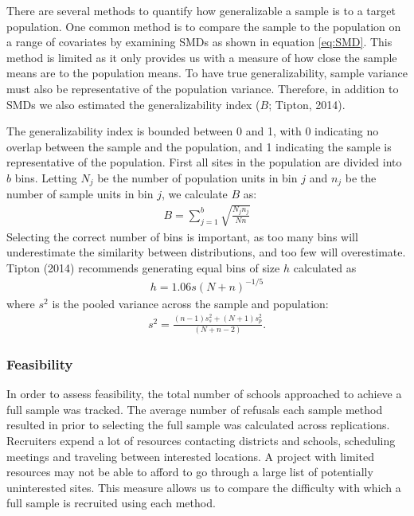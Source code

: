 \documentclass[man,floatsintext]{apa6}
\begin{document}
There are several methods to quantify how generalizable a sample is to a target population. One common method is to compare the sample to the population on a range of covariates by examining SMDs as shown in equation \eqref{eq:SMD}. This method is limited as it only provides us with a measure of how close the sample means are to the population means. To have true generalizability, sample variance must also be representative of the population variance. Therefore, in addition to SMDs we also estimated the generalizability index (\(B\); Tipton, 2014).

The generalizability index is bounded between 0 and 1, with 0 indicating no overlap between the sample and the population, and 1 indicating the sample is representative of the population. First all sites in the population are divided into \(b\) bins. Letting \(N_j\) be the number of population units in bin \(j\) and \(n_j\) be the number of sample units in bin \(j\), we calculate \(B\) as:
\begin{align}
B = \sum^b_{j=1}\sqrt{\frac{N_j n_j}{N n}}
\end{align}
Selecting the correct number of bins is important, as too many bins will underestimate the similarity between distributions, and too few will overestimate. Tipton (2014) recommends generating equal bins of size \(h\) calculated as
\begin{align}
h = 1.06s(N+n)^{-1/5}
\end{align}
where \(s^2\) is the pooled variance across the sample and population:
\begin{align}
s^2 = \frac{(n - 1)s^2_s + (N + 1)s^2_p}{(N + n - 2)}.
\end{align}

\hypertarget{feasibility}{%
\subsubsection{Feasibility}\label{feasibility}}

In order to assess feasibility, the total number of schools approached to achieve a full sample was tracked. The average number of refusals each sample method resulted in prior to selecting the full sample was calculated across replications. Recruiters expend a lot of resources contacting districts and schools, scheduling meetings and traveling between interested locations. A project with limited resources may not be able to afford to go through a large list of potentially uninterested sites. This measure allows us to compare the difficulty with which a full sample is recruited using each method.
\end{document}
